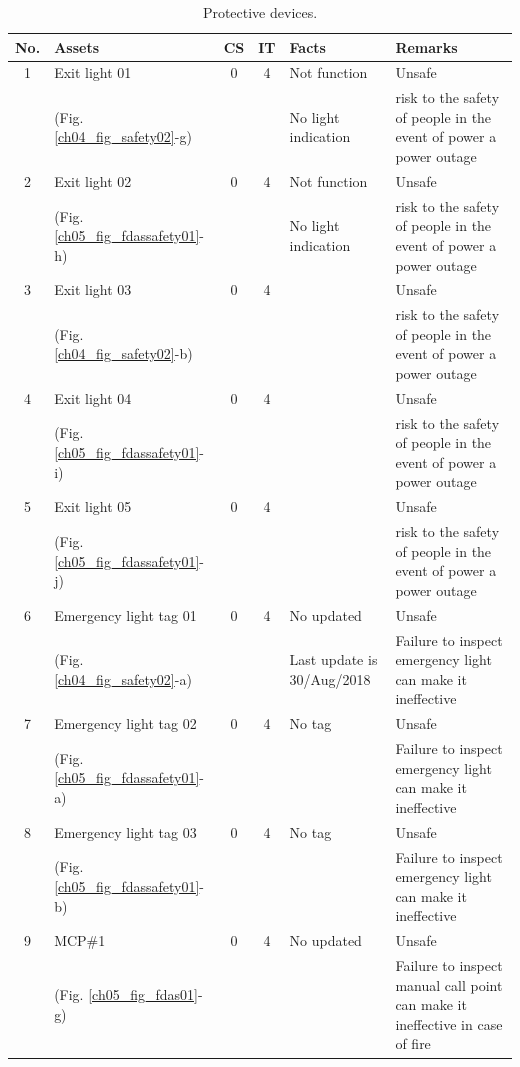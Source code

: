 \begin{table}[!htb]
	\caption{Protective devices.}
	\label{ch05_tbl_fdassafe01}
	{\scriptsize
\begin{tabular}{c|l|c|c|p{3cm}|p{5cm}}
	\hline
	No. & Assets & CS & IT & Facts & Remarks \\ 
	\hline
	1 & Exit light 01 & 0 & 4 & Not function & Unsafe \\ 
	& (Fig. \ref{ch04_fig_safety02}-g) &  &  & No light indication & risk to the safety of people in the event of power a power outage \\ 
	\hline
	2 & Exit light 02 & 0 & 4 & Not function & Unsafe \\ 
	& (Fig. \ref{ch05_fig_fdassafety01}-h) &  &  & No light indication & risk to the safety of people in the event of power a power outage \\ 
	\hline
	3 & Exit light 03 & 0 & 4 &  & Unsafe \\ 
	& (Fig. \ref{ch04_fig_safety02}-b) &  &  &  & risk to the safety of people in the event of power a power outage \\ 
	\hline
	4 & Exit light 04 & 0 & 4 &  & Unsafe \\ 
	& (Fig. \ref{ch05_fig_fdassafety01}-i) &  &  &  & risk to the safety of people in the event of power a power outage \\ 
	\hline
	5 & Exit light 05 & 0 & 4 &  & Unsafe \\ 
	& (Fig. \ref{ch05_fig_fdassafety01}-j) &  &  &  & risk to the safety of people in the event of power a power outage \\ 
	\hline
	6 & Emergency light tag 01  & 0 & 4 & No updated & Unsafe \\ 
	& (Fig. \ref{ch04_fig_safety02}-a) &  &  & Last update is 30/Aug/2018 & Failure to inspect emergency light can make it ineffective  \\ 
	\hline
	7 & Emergency light tag 02 & 0 & 4 & No tag & Unsafe \\ 
	& (Fig. \ref{ch05_fig_fdassafety01}-a) &  &  &  & Failure to inspect emergency light can make it ineffective  \\ 
	\hline
	8 & Emergency light tag 03 & 0 & 4 & No tag & Unsafe \\ 
	& (Fig. \ref{ch05_fig_fdassafety01}-b) &  &  &  & Failure to inspect emergency light can make it ineffective  \\ 
	\hline
	9 & MCP\#1 & 0 & 4 & No updated & Unsafe \\ 
	& (Fig. \ref{ch05_fig_fdas01}-g) &  &  &  & Failure to inspect manual call point can make it ineffective in case of fire \\ 

\end{tabular}}
\end{table}
